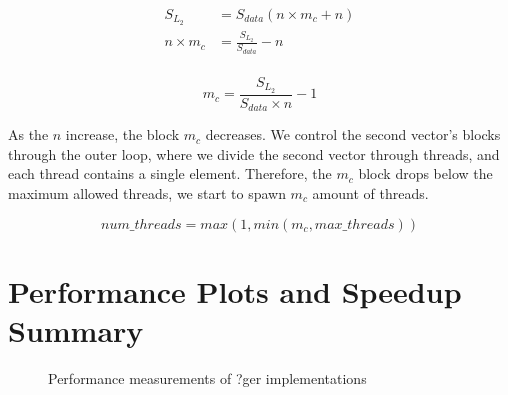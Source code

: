 \begin{align*}
    S_{L_2} &= S_{data}(n \times m_c + n)\\
    n \times m_c &= \frac{S_{L_2}}{S_{data}} - n\\
\end{align*}

\begin{equation}
    m_c = \frac{S_{L_2}}{S_{data} \times n} - 1
    \label{eq:outer_block}
\end{equation}

As the $n$ increase, the block $m_c$ decreases. 
We control the second vector's blocks through the outer loop, 
where we divide the second vector through threads, and each 
thread contains a single element. Therefore, 
the $m_c$ block drops below the maximum allowed threads, 
we start to spawn $m_c$ amount of threads.

\begin{equation}
    num\_threads = max(1, min(m_c,max\_threads)) 
    \label{eq:outer_num_threads}
\end{equation}

\clearpage
\section{Performance Plots and Speedup Summary}

\begin{figure}[htb]
    \centering
    \caption*{Performance measurements of ?ger implementations}
    \label{fig:outer_Sgflop220}
    \qquad
    \label{fig:outer_Dgflop220}
\end{figure}

